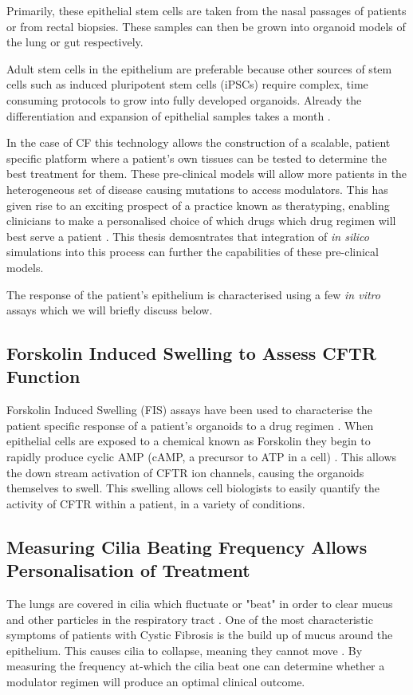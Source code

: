 Primarily, these epithelial stem cells are taken from the nasal passages of patients or from rectal biopsies. These samples can then be grown into organoid models of the lung or gut respectively. 

Adult stem cells in the epithelium are preferable because other sources of stem cells such as induced pluripotent stem cells (iPSCs) require complex, time consuming protocols to grow into fully developed organoids. Already the differentiation and expansion of epithelial samples takes a month \cite{}.

In the case of CF this technology allows the construction of a scalable, patient specific platform where a patient's own tissues can be tested to determine the best treatment for them. These pre-clinical models will allow more patients in the heterogeneous set of disease causing mutations to access modulators. This has given rise to an exciting prospect of a practice known as theratyping, enabling clinicians to make a personalised choice of which drugs which drug regimen will best serve a patient \cite{clancy2019, wong2022, wong2022a, ciciriello2022}. This thesis demosntrates that integration of \textit{in silico} simulations into this process can further the capabilities of these pre-clinical models.

The response of the patient's epithelium is characterised using a few \textit{in vitro} assays which we will briefly discuss below. 

\subsection{Forskolin Induced Swelling to Assess CFTR Function}
Forskolin Induced Swelling (FIS) assays have been used to characterise the patient specific response of a patient's organoids to a drug regimen \cite{dekkers2013}. When epithelial cells are exposed to a chemical known as Forskolin they begin to rapidly produce cyclic AMP (cAMP, a precursor to ATP in a cell) \cite{}. This allows the down stream activation of CFTR ion channels, causing the organoids themselves to swell. This swelling allows cell biologists to easily quantify the activity of CFTR within a patient, in a variety of conditions.

\subsection{Measuring Cilia Beating Frequency Allows Personalisation of Treatment}
The lungs are covered in cilia which fluctuate or "beat" in order to clear mucus and other particles in the respiratory tract \cite{mitchison2010, bustamante-marin2017}. One of the most characteristic symptoms of patients with Cystic Fibrosis is the build up of mucus around the epithelium. This causes cilia to collapse, meaning they cannot move \cite{}. By measuring the frequency at-which the cilia beat one can determine whether a modulator regimen will produce an optimal clinical outcome.

